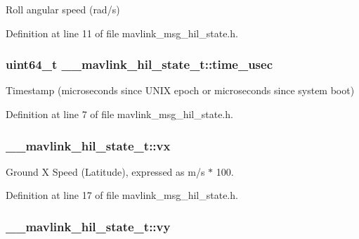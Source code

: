 Roll angular speed (rad/s) 



Definition at line 11 of file mavlink\-\_\-msg\-\_\-hil\-\_\-state.\-h.

\hypertarget{struct____mavlink__hil__state__t_a19f9efdaaddd6d9699f8225bf5a4d4ef}{
\subsubsection[{time\-\_\-usec}]{\setlength{\rightskip}{0pt plus 5cm}uint64\-\_\-t \-\_\-\-\_\-mavlink\-\_\-hil\-\_\-state\-\_\-t\-::time\-\_\-usec}}\label{struct____mavlink__hil__state__t_a19f9efdaaddd6d9699f8225bf5a4d4ef}


Timestamp (microseconds since U\-N\-I\-X epoch or microseconds since system boot) 



Definition at line 7 of file mavlink\-\_\-msg\-\_\-hil\-\_\-state.\-h.

\hypertarget{struct____mavlink__hil__state__t_a8ea365258210e69427e6c02f82aa710c}{
\subsubsection[{vx}]{ \-\_\-\-\_\-mavlink\-\_\-hil\-\_\-state\-\_\-t\-::vx}}\label{struct____mavlink__hil__state__t_a8ea365258210e69427e6c02f82aa710c}


Ground X Speed (Latitude), expressed as m/s $\ast$ 100. 



Definition at line 17 of file mavlink\-\_\-msg\-\_\-hil\-\_\-state.\-h.

\hypertarget{struct____mavlink__hil__state__t_a8d3234cf343035ab3f240f23fac95072}{
\subsubsection[{vy}]{ \-\_\-\-\_\-mavlink\-\_\-hil\-\_\-state\-\_\-t\-::vy}}\label{struct____mavlink__hil__state__t_a8d3234cf343035ab3f240f23fac95072}


